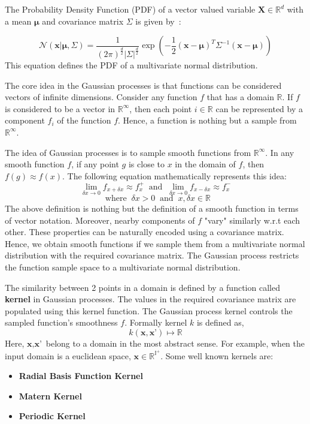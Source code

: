 \documentclass[12pt, twoside, ngerman]{report}
\begin{document}
The Probability Density Function (PDF) of a vector valued variable $\textbf{X} \in \mathbb{R}^d$ with a mean $\boldsymbol{\mu}$ and covariance matrix $\Sigma$ is given by~\cite{MITMLBook}:

$$
\mathcal{N}(\textbf{x} | \boldsymbol{\mu},  \Sigma) = 
\frac{1}{(2\pi)^{\frac{d}{2}} |\Sigma|^{\frac{d}{2}}}
\exp\left( - \frac{1}{2} (\textbf{x} - \boldsymbol{\mu})^T  \Sigma^{-1}   (\textbf{x} - \boldsymbol{\mu}) \right)
$$
This equation defines the PDF of a multivariate normal distribution.

The core idea in the Gaussian processes is that functions can be considered vectors of infinite dimensions.
Consider any function $f$ that has a domain $\mathbb{R}$.
If $f$ is considered to be a vector in $\mathbb{R}^{\infty}$,
then each point $i \in \mathbb{R}$  can be represented by a component $f_i$ of the function $f$.
Hence, a function is nothing but a sample from $\mathbb{R}^{\infty}$.

The idea of Gaussian processes is to sample smooth functions from $\mathbb{R}^{\infty}$.
In any smooth function $f$, if any point $g$ is close to $x$ in the domain of $f$, then $f(g) \approx f(x)$.
The following equation mathematically represents this idea:
$$
\lim_{\delta x \to 0} f_{x + \delta x} \approx f^{+}_x  \;\; \textrm{and} \;\; 
\lim_{\delta x \to 0} f_{x - \delta x} \approx f^{-}_x 
$$
$$\;\; \textrm{where} \;\; \delta x > 0 \;\; \textrm{and} \;\; x, \delta x \in \mathbb{R}
$$
The above definition is nothing but the definition of a smooth function in terms of vector notation. 
Moreover, nearby components of $f$ "vary" similarly w.r.t each other.
These properties can be naturally encoded using a covariance matrix.
Hence, we obtain smooth functions if we sample them from a multivariate normal distribution with the required covariance matrix.
The Gaussian process restricts the function sample space to a multivariate normal distribution.

The similarity between 2 points in a domain is defined by a function called \textbf{kernel} in Gaussian processes.
The values in the required covariance matrix are populated using this kernel function.
The Gaussian process kernel controls the sampled function's smoothness $f$.
Formally kernel $k$ is defined as,
$$
k(\textbf{x}, \textbf{x'}) \mapsto \mathbb{R}
$$
Here, $\textbf{x}, \textbf{x'}$ belong to a domain in the most abstract sense.
For example,  when the input domain is a euclidean space,  $\textbf{x} \in \mathbb{R}^{\mathbb{I}^+}$.
Some well known kernels are:
\begin{itemize}
\item \textbf{Radial Basis Function Kernel}
\item \textbf{Matern Kernel}
\item \textbf{Periodic Kernel}
\end{itemize}
\end{document}
